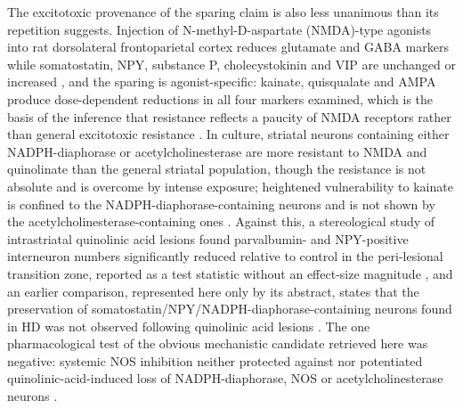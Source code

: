 \documentclass[11pt]{article}
\begin{document}
The excitotoxic provenance of the sparing claim is also less unanimous than its repetition suggests. Injection of N-methyl-D-aspartate (NMDA)-type agonists into rat dorsolateral frontoparietal cortex reduces glutamate and GABA markers while somatostatin, NPY, substance P, cholecystokinin and VIP are unchanged or increased \citep{Beal1991a}, and the sparing is agonist-specific: kainate, quisqualate and AMPA produce dose-dependent reductions in all four markers examined, which is the basis of the inference that resistance reflects a paucity of NMDA receptors rather than general excitotoxic resistance \citep{Beal1989}. In culture, striatal neurons containing either NADPH-diaphorase or acetylcholinesterase are more resistant to NMDA and quinolinate than the general striatal population, though the resistance is not absolute and is overcome by intense exposure; heightened vulnerability to kainate is confined to the NADPH-diaphorase-containing neurons and is not shown by the acetylcholinesterase-containing ones \citep{Koh1988}. Against this, a stereological study of intrastriatal quinolinic acid lesions found parvalbumin- and NPY-positive interneuron numbers significantly reduced relative to control in the peri-lesional transition zone, reported as a test statistic without an effect-size magnitude \citep{Feng2014}, and an earlier comparison, represented here only by its abstract, states that the preservation of somatostatin/NPY/NADPH-diaphorase-containing neurons found in HD was not observed following quinolinic acid lesions \citep{Davies1988}. The one pharmacological test of the obvious mechanistic candidate retrieved here was negative: systemic NOS inhibition neither protected against nor potentiated quinolinic-acid-induced loss of NADPH-diaphorase, NOS or acetylcholinesterase neurons \citep{Mackenzie1995}.
\end{document}
